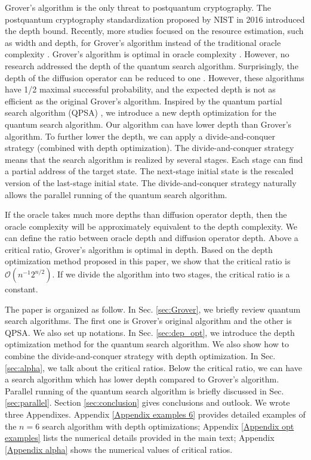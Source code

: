 \documentclass[%
 twocolumn,
 10pt,
 superscriptaddress,
 longbibliography,
 amsmath,amssymb,
 aps,
 pra,
floatfix,
]{revtex4-1}
\begin{document}
Grover's algorithm is the only threat to postquantum cryptography. The postquantum cryptography standardization proposed by NIST in 2016 introduced the depth bound. Recently, more studies focused on the resource estimation, such as width and depth, for Grover's algorithm instead of the traditional oracle complexity \cite{KHJ18,JNRV19}. Grover's algorithm is optimal in oracle complexity \cite{BBHT98,Zalka99}. However, no research addressed the depth of the quantum search algorithm. Surprisingly, the depth of the diffusion operator can be reduced to one \cite{Kato05,JRW17}. However, these algorithms have 1/2 maximal successful probability, and the expected depth is not as efficient as the original Grover's algorithm. Inspired by the quantum partial search algorithm (QPSA) \cite{GR05,KG06,Korepin05,KL06}, we introduce a new depth optimization for the quantum search algorithm. Our algorithm can have lower depth than Grover's algorithm. To further lower the depth, we can apply a divide-and-conquer strategy (combined with depth optimization). The divide-and-conquer strategy means that the search algorithm is realized by several stages. Each stage can find a partial address of the target state. The next-stage initial state is the rescaled version of the last-stage initial state. The divide-and-conquer strategy naturally allows the parallel running of the quantum search algorithm.

If the oracle takes much more depths than diffusion operator depth, then the oracle complexity will be approximately equivalent to the depth complexity. We can define the ratio between oracle depth and diffusion operator depth. Above a critical ratio, Grover's algorithm is optimal in depth. Based on the depth optimization method proposed in this paper, we show that the critical ratio is $\mathcal O(n^{-1}2^{n/2})$. If we divide the algorithm into two stages, the critical ratio is a constant.

The paper is organized as follow. In Sec. \ref{sec:Grover}, we briefly review  quantum search algorithms. The first one is Grover's original algorithm and the other is QPSA. We also set up  notations. In Sec. \ref{sec:dep_opt}, we introduce the depth optimization method for the quantum search algorithm. We also show how to combine the divide-and-conquer strategy with depth optimization. In Sec. \ref{sec:alpha}, we talk about the critical ratios. Below the critical ratio, we can have a search algorithm which has lower depth compared to Grover's algorithm. Parallel running of the quantum search algorithm is briefly discussed in Sec. \ref{sec:parallel}. Section \ref{sec:conclusion} gives conclusions and outlook. We wrote three Appendixes. Appendix \ref{Appendix examples 6} provides detailed examples of the $n=6$ search algorithm with depth optimizations; Appendix \ref{Appendix opt examples} lists the numerical details provided in the main text; Appendix \ref{Appendix alpha} shows the numerical values of critical ratios.
\end{document}
